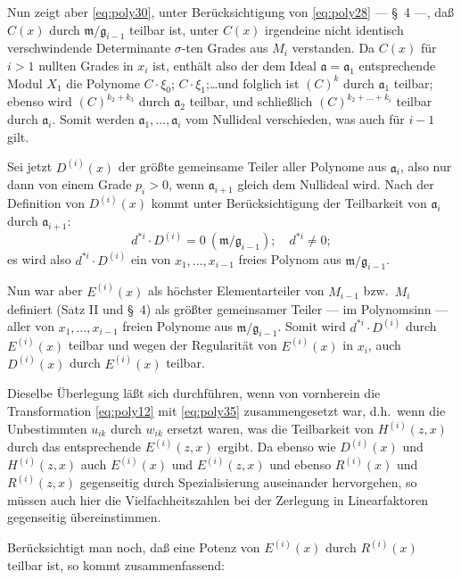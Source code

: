 \documentclass[fontsize=10pt,paper=a5,pagesize,headings=small]{scrbook}
\newcommand{\ideal}[1]{\mathfrak{#1}}
\theoremstyle{plain}
\begin{document}
Nun zeigt aber \eqref{eq:poly30}, unter Berücksichtigung von \eqref{eq:poly28} --- \S~4 ---,
daß $C(x)$ durch $\ideal{m}/\ideal{g}_{i-1}$ teilbar ist, unter $C(x)$ irgendeine nicht identisch
verschwindende Determinante $\sigma$-ten Grades aus $M_i$ verstanden. Da $C(x)$ für
$i > 1$ nullten Grades in $x_i$ ist, enthält also der dem Ideal $\ideal{a} = \ideal{a}_1$ entsprechende
Modul $X_1$ die Polynome $C \cdot \xi_0$; $C \cdot \xi_1$;\dots und folglich ist $(C)^k$ durch $\ideal{a}_1$
teilbar; ebenso wird $(C)^{k_2+k_3}$ durch $\ideal{a}_2$ teilbar, und schließlich $(C)^{k_2+\dots+k_i}$
teilbar durch $\ideal{a}_i$. Somit werden $\ideal{a}_1,\dots,\ideal{a}_i$ vom Nullideal verschieden, was auch
für $i-1$ gilt.

\newpage
\setcounter{page}{448}

Sei jetzt $D^{(i)}(x)$ der größte gemeinsame Teiler aller Polynome aus $\ideal{a}_i$, also nur
dann von einem Grade $p_i > 0$, wenn $\ideal{a}_{i+1}$ gleich dem Nullideal wird. Nach der
Definition von $D^{(i)}(x)$ kommt unter Berücksichtigung der Teilbarkeit von $\ideal{a}_i$ durch
$\ideal{a}_{i+1}$:
\[ d^{*i} \cdot D^{(i)} = 0\ (\ideal{m}/\ideal{g}_{i-1});\quad d^{*i} \neq 0; \]
es wird also $d^{*i} \cdot D^{(i)}$ ein von $x_1,\dots,x_{i-1}$ freies Polynom aus $\ideal{m}/\ideal{g}_{i-1}$.

Nun war aber $E^{(i)}(x)$ als höchster Elementarteiler von $M_{i-1}$ bzw.~$M_i$ definiert
(Satz II und \S~4) als größter gemeinsamer Teiler --- im Polynomsinn --- aller von
$x_1,\dots,x_{i-1}$ freien Polynome aus $\ideal{m}/\ideal{g}_{i-1}$. Somit wird $d^{*i} \cdot D^{(i)}$ durch $E^{(i)}(x)$
teilbar und wegen der Regularität von $E^{(i)}(x)$ in $x_i$, auch $D^{(i)}(x)$ durch $E^{(i)}(x)$
teilbar.

Dieselbe Überlegung läßt sich durchführen, wenn von vornherein die
Transformation \eqref{eq:poly12} mit \eqref{eq:poly35} zusammengesetzt war, d.h.~wenn die
Unbestimmten $u_{ik}$ durch $w_{ik}$ ersetzt waren, was die Teilbarkeit von $H^{(i)}(z,x)$ durch
das entsprechende $E^{(i)}(z,x)$ ergibt. Da ebenso wie $D^{(i)}(x)$ und $H^{(i)}(z,x)$ auch
$E^{(i)}(x)$ und $E^{(i)}(z,x)$ und ebenso $R^{(i)}(x)$ und $R^{(i)}(z,x)$ gegenseitig durch
Spezialisierung auseinander hervorgehen, so müssen auch hier die Vielfachheitszahlen
bei der Zerlegung in Linearfaktoren gegenseitig übereinstimmen.

Berücksichtigt man noch, daß eine Potenz von $E^{(i)}(x)$ durch $R^{(i)}(x)$ teilbar ist,
so kommt zusammenfassend:
\end{document}
